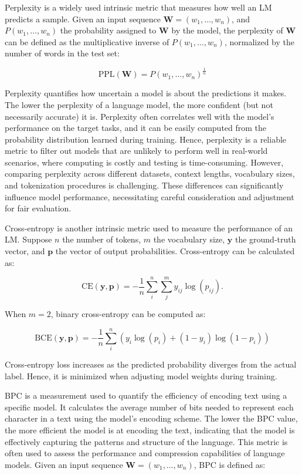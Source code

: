 Perplexity is a widely used intrinsic metric that measures how well an \ac{LM} predicts a sample. Given an input sequence $\bm{W} = (w_1, \ldots, w_n)$, and $P(w_1, \ldots, w_n)$ the probability assigned to $\bm{W}$ by the model, the perplexity of $\bm{W}$ can be defined as the multiplicative inverse of $P(w_1, \ldots, w_n)$, normalized by the number of words in the test set:

\begin{equation}
    \text{PPL}(\bm{W}) = P(w_1, \ldots, w_n)^{\frac{1}{n}}
\end{equation}

Perplexity quantifies how uncertain a model is about the predictions it makes. The lower the perplexity of a language model, the more confident (but not necessarily accurate) it is. Perplexity often correlates well with the model's performance on the target tasks, and it can be easily computed from the probability distribution learned during training. Hence, perplexity is a reliable metric to filter out models that are unlikely to perform well in real-world scenarios, where computing is costly and testing is time-consuming. However, comparing perplexity across different datasets, context lengths, vocabulary sizes, and tokenization procedures is challenging. These differences can significantly influence model performance, necessitating careful consideration and adjustment for fair evaluation.

Cross-entropy is another intrinsic metric used to measure the performance of an \ac{LM}. Suppose $n$ the number of tokens, $m$ the vocabulary size, $\bm{y}$ the ground-truth vector, and $\bm{p}$ the vector of output probabilities. Cross-entropy can be calculated as:

\begin{equation}
    \text{CE}(\bm{y}, \bm{p}) = - \dfrac{1}{n} \sum_{i}^n \sum_{j}^m y_{ij} \log (p_{ij}).
\end{equation}

\noindent When $m = 2$, binary cross-entropy can be computed as:

\begin{equation}
    \text{BCE}(\bm{y}, \bm{p}) = - \dfrac{1}{n} \sum_{i}^n (y_i \log(p_i) + (1-y_i) \log (1-p_i))
\end{equation}

\noindent Cross-entropy loss increases as the predicted probability diverges from the actual label. Hence, it is minimized when adjusting model weights during training. 

\ac{BPC} is a measurement used to quantify the efficiency of encoding text using a specific model. It calculates the average number of bits needed to represent each character in a text using the model's encoding scheme. The lower the \ac{BPC} value, the more efficient the model is at encoding the text, indicating that the model is effectively capturing the patterns and structure of the language. This metric is often used to assess the performance and compression capabilities of language models. Given an input sequence $\bm{W} = (w_1, \ldots, w_n)$, \ac{BPC} is defined as:

